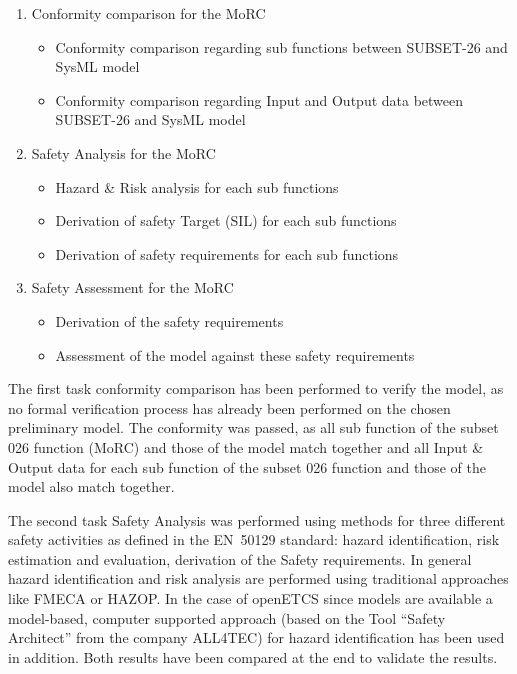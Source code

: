 \documentclass{template/openetcs_report}
\begin{document}
 
\begin{enumerate}
\item Conformity comparison for the MoRC
	\begin{itemize}
	\item Conformity comparison regarding sub functions between SUBSET-26 and SysML model
	\item Conformity comparison regarding Input and Output data between SUBSET-26 and SysML model
	\end{itemize}
	
\item Safety Analysis for the MoRC
	\begin{itemize}
	\item Hazard \& Risk analysis for each sub functions
	\item Derivation of safety Target (SIL) for each sub functions
	\item Derivation of safety requirements for each sub functions
	\end{itemize}
	
\item Safety Assessment for the MoRC
	\begin{itemize}
	\item Derivation of the safety requirements
	\item Assessment of the model against these safety requirements
	\end{itemize}
\end{enumerate} 
 

The first task conformity comparison has been performed to verify the model, as no formal verification process has already been performed on the chosen preliminary model. The conformity was passed, as all sub function of the subset 026 function (MoRC) and those of the model match together and all Input \& Output data for each sub function of the subset 026 function and those of the model also match together. 

 
The second task Safety Analysis was performed using methods for three different safety activities as defined in the EN~50129 standard: hazard identification,
risk estimation and evaluation, derivation of the Safety requirements. In general hazard identification and risk analysis are performed using traditional approaches like FMECA or HAZOP. In the case of openETCS since models are available a model-based, computer supported approach (based on the Tool “Safety Architect” from the company ALL4TEC) for hazard identification has been used in addition.
Both results have been compared at the end to validate the results.
 
\end{document}
